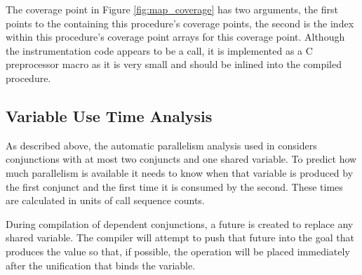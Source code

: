 The coverage point in Figure \ref{fig:map_coverage}
has two arguments,
the first points to the \PS containing this procedure's coverage points,
the second is the index within this procedure's coverage point arrays
for this coverage point.
Although the instrumentation code appears to be a call,
it is implemented as a C preprocessor macro as it is very small and should
be inlined into the compiled procedure.


\subsection{Variable Use Time Analysis}
\label{sec:var_use_time}

As described above,
the automatic parallelism analysis used in \citet{bone:2008:hons} considers
conjunctions with at most two conjuncts and one shared variable.
To predict how much parallelism is available it needs to know
when that variable is produced by the first conjunct
and the first time it is consumed by the second.
These times are calculated in units of call sequence counts.

During compilation of dependent conjunctions,
a future is created to replace any shared variable.
The compiler will attempt to push that future into the goal that
produces the value so that,
if possible,
the \signal operation will be placed immediately after the unification
that binds the variable.

